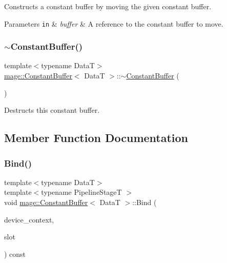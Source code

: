Constructs a constant buffer by moving the given constant buffer.


\begin{DoxyParams}[1]{Parameters}
\mbox{\tt in}  & {\em buffer} & A reference to the constant buffer to move. \\
\hline
\end{DoxyParams}
\hypertarget{classmage_1_1_constant_buffer_a874e9507ea3b6d2f630f061c2fc6d2d0}{}\label{classmage_1_1_constant_buffer_a874e9507ea3b6d2f630f061c2fc6d2d0} 
\subsubsection{\texorpdfstring{$\sim$\+Constant\+Buffer()}{~ConstantBuffer()}}
{\footnotesize\ttfamily template$<$typename DataT$>$ \\
\hyperlink{classmage_1_1_constant_buffer}{mage\+::\+Constant\+Buffer}$<$ DataT $>$\+::$\sim$\hyperlink{classmage_1_1_constant_buffer}{Constant\+Buffer} (\begin{DoxyParamCaption}{ }\end{DoxyParamCaption})\hspace{0.3cm}{\ttfamily [default]}}

Destructs this constant buffer. 

\subsection{Member Function Documentation}
\hypertarget{classmage_1_1_constant_buffer_a7592eed823334cdc3da614121f2b25ca}{}\label{classmage_1_1_constant_buffer_a7592eed823334cdc3da614121f2b25ca} 
\subsubsection{\texorpdfstring{Bind()}{Bind()}}
{\footnotesize\ttfamily template$<$typename DataT$>$ \\
template$<$typename Pipeline\+StageT $>$ \\
void \hyperlink{classmage_1_1_constant_buffer}{mage\+::\+Constant\+Buffer}$<$ DataT $>$\+::Bind (\begin{DoxyParamCaption}\item[{I\+D3\+D11\+Device\+Context4 $\ast$}]{device\+\_\+context,  }\item[{\hyperlink{namespacemage_a41c104c036fba3756a74e19f793eeaa1}{U32}}]{slot }\end{DoxyParamCaption}) const\hspace{0.3cm}{\ttfamily [noexcept]}}

